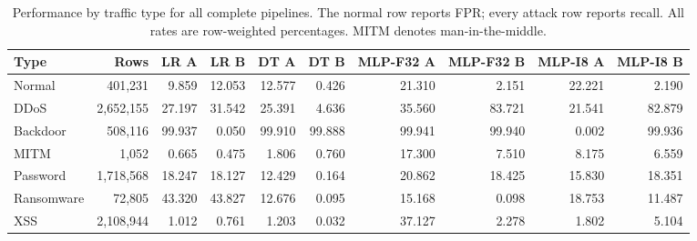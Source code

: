 \begin{table}[H]
\caption{Performance by traffic type for all complete pipelines. The normal row reports FPR; every attack row reports recall. All rates are row-weighted percentages. MITM denotes man-in-the-middle.}\label{tab:types-complete}
\centering\scriptsize\setlength{\tabcolsep}{3pt}
\begin{tabular}{lrrrrrrrrr}
\toprule
Type & Rows & LR A & LR B & DT A & DT B & MLP-F32 A & MLP-F32 B & MLP-I8 A & MLP-I8 B \\
\midrule
Normal & 401,231 & 9.859 & 12.053 & 12.577 & 0.426 & 21.310 & 2.151 & 22.221 & 2.190 \\
DDoS & 2,652,155 & 27.197 & 31.542 & 25.391 & 4.636 & 35.560 & 83.721 & 21.541 & 82.879 \\
Backdoor & 508,116 & 99.937 & 0.050 & 99.910 & 99.888 & 99.941 & 99.940 & 0.002 & 99.936 \\
MITM & 1,052 & 0.665 & 0.475 & 1.806 & 0.760 & 17.300 & 7.510 & 8.175 & 6.559 \\
Password & 1,718,568 & 18.247 & 18.127 & 12.429 & 0.164 & 20.862 & 18.425 & 15.830 & 18.351 \\
Ransomware & 72,805 & 43.320 & 43.827 & 12.676 & 0.095 & 15.168 & 0.098 & 18.753 & 11.487 \\
XSS & 2,108,944 & 1.012 & 0.761 & 1.203 & 0.032 & 37.127 & 2.278 & 1.802 & 5.104 \\
\bottomrule
\end{tabular}
\end{table}
